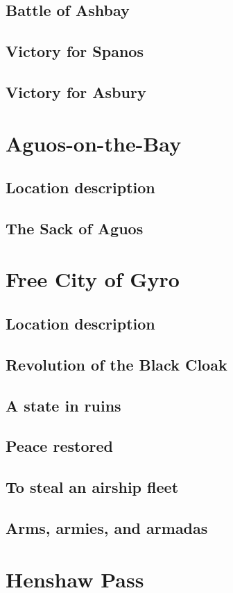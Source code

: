 \documentclass{report}
\theoremstyle{definition}
\begin{document}
\section{Battle of Ashbay}
\section{Victory for Spanos}
\section{Victory for Asbury}
\chapter{Aguos-on-the-Bay}
\section{Location description}
\section{The Sack of Aguos}
\chapter{Free City of Gyro}
\section{Location description}
\section{Revolution of the Black Cloak}
\section{A state in ruins}
\section{Peace restored}
\section{To steal an airship fleet}
\section{Arms, armies, and armadas}
\chapter{Henshaw Pass}
\end{document}
